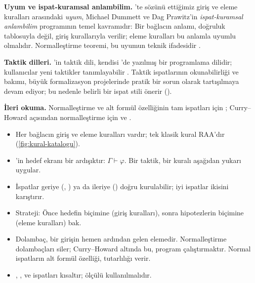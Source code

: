 \begin{arastirmanotu}
\textbf{Uyum ve ispat-kuramsal anlambilim.} 'te
sözünü ettiğimiz giriş ve eleme kuralları arasındaki \emph{uyum}, Michael
Dummett ve Dag Prawitz'in \emph{ispat-kuramsal anlambilim} programının
temel kavramıdır: Bir bağlacın anlamı, doğruluk tablosuyla değil, giriş
kurallarıyla verilir; eleme kuralları bu anlamla uyumlu olmalıdır.
Normalleştirme teoremi, bu uyumun teknik ifadesidir
\citep{prawitz1965, dummett2000}.

\textbf{Taktik dilleri.} \Lean{}'in taktik dili, kendisi \Lean{}'de
yazılmış bir programlama dilidir; kullanıcılar yeni taktikler
tanımlayabilir \citep{demoura2021lean4, ullrich2022macros}. Taktik
ispatlarının okunabilirliği ve bakımı, büyük formalizasyon projelerinde
pratik bir sorun olarak tartışılmaya devam ediyor; \Mathlib{} bu nedenle
belirli bir ispat stili önerir ().

\textbf{İleri okuma.} Normalleştirme ve alt formül özelliğinin tam
ispatları için \citet{troelstra2000}; Curry--Howard açısından
normalleştirme için \citet{girard1989} ve \citet{sorensen2006}.
\end{arastirmanotu}

\begin{bolumozeti}
\begin{itemize}
  \item Her bağlacın giriş ve eleme kuralları vardır; tek klasik kural
        RAA'dır (\cref{fig:kural-katalogu}).
  \item \Lean{}'in hedef ekranı bir ardışıktır: $\Gamma \vdash \varphi$.
        Bir taktik, bir kuralı aşağıdan yukarı uygular.
  \item İspatlar geriye (, ) ya da
        ileriye () doğru kurulabilir; iyi ispatlar ikisini
        karıştırır.
  \item Strateji: Önce hedefin biçimine (giriş kuralları), sonra
        hipotezlerin biçimine (eleme kuralları) bak.
  \item Dolambaç, bir girişin hemen ardından gelen elemedir. Normalleştirme
        dolambaçları siler; Curry--Howard altında bu, program çalıştırmaktır.
        Normal ispatların alt formül özelliği, tutarlılığı verir.
  \item \lc{<;>}, ,  ve 
        ispatları kısaltır; ölçülü kullanılmalıdır.
\end{itemize}
\end{bolumozeti}

